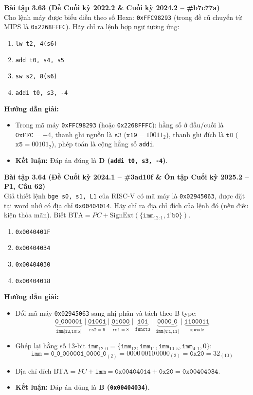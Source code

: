 \textbf{Bài tập 3.63 (Đề Cuối kỳ 2022.2 \& Cuối kỳ 2024.2 -- \#b7c77a)}\\
Cho lệnh máy được biểu diễn theo số Hexa: \texttt{0xFFC98293} (trong đề cũ chuyển từ MIPS là \texttt{0x2268FFFC}). Hãy chỉ ra lệnh hợp ngữ tương ứng:
\begin{enumerate}[label=\Alph*.]
    \item \texttt{lw t2, 4(s6)}
    \item \texttt{add t0, s4, s5}
    \item \texttt{sw s2, 8(s6)}
    \item \texttt{addi t0, s3, -4}
\end{enumerate}
\textbf{Hướng dẫn giải:}
\begin{itemize}
    \item Trong mã máy \texttt{0xFFC98293} (hoặc \texttt{0x2268FFFC}): hằng số ở đầu/cuối là $\texttt{0xFFC} = -4$, thanh ghi nguồn là $\texttt{s3}$ ($\texttt{x19} = 10011_2$), thanh ghi đích là $\texttt{t0}$ ($\texttt{x5} = 00101_2$), phép toán là cộng hằng số \texttt{addi}.
    \item \textbf{Kết luận:} Đáp án đúng là \textbf{D (\texttt{addi t0, s3, -4})}.
\end{itemize}

\textbf{Bài tập 3.64 (Đề Cuối kỳ 2024.1 -- \#3ad10f \& Ôn tập Cuối kỳ 2025.2 -- P1, Câu 62)}\\
Giả thiết lệnh \texttt{bge s0, s1, L1} của RISC-V có mã máy là \texttt{0x02945063}, được đặt tại word nhớ có địa chỉ \texttt{0x00404014}. Hãy chỉ ra địa chỉ đích của lệnh đó (nếu điều kiện thỏa mãn). Biết $\text{BTA} = PC + \text{SignExt}(\{\texttt{imm}_{12:1}, \texttt{1'b0}\})$.
\begin{enumerate}[label=\Alph*.]
    \item \texttt{0x0040401F}
    \item \texttt{0x00404034}
    \item \texttt{0x00404030}
    \item \texttt{0x00404018}
\end{enumerate}
\textbf{Hướng dẫn giải:}
\begin{itemize}
    \item Đổi mã máy \texttt{0x02945063} sang nhị phân và tách theo B-type:
    $$\underbrace{\texttt{0\_000001}}_{\texttt{imm[12,10:5]}} \mid \underbrace{\texttt{01001}}_{\texttt{rs2}=9} \mid \underbrace{\texttt{01000}}_{\texttt{rs1}=8} \mid \underbrace{\texttt{101}}_{\texttt{funct3}} \mid \underbrace{\texttt{0000\_0}}_{\texttt{imm[4:1,11]}} \mid \underbrace{\texttt{1100011}}_{\text{opcode}}$$
    \item Ghép lại hằng số 13-bit $\texttt{imm}_{12:0} = \{\texttt{imm}_{12}, \texttt{imm}_{11}, \texttt{imm}_{10:5}, \texttt{imm}_{4:1}, 0\}$:
    $$\texttt{imm} = \texttt{0\_0\_000001\_0000\_0}_{(2)} = 0000\,0010\,0000_{(2)} = \texttt{0x20} = 32_{(10)}$$
    \item Địa chỉ đích $\text{BTA} = PC + \texttt{imm} = \texttt{0x00404014} + \texttt{0x20} = \mathbf{\texttt{0x00404034}}$.
    \item \textbf{Kết luận:} Đáp án đúng là \textbf{B (\texttt{0x00404034})}.
\end{itemize}

